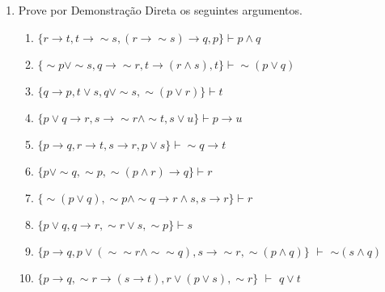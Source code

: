 \documentclass[12pt, a4paper,final]{article}
\begin{document}
    \begin{enumerate}
        \item Prove por Demonstração Direta os seguintes argumentos.
        
        \begin{enumerate}

            \item $\{r  \rightarrow t, t \rightarrow \sim s,  (r \rightarrow \sim s) \rightarrow q,  p  \} \vdash p \wedge q $  %
            
            \item $\{\sim p  \vee \sim s, q \rightarrow \sim r,  t \rightarrow  (r \wedge s), t\} \vdash \sim (p \vee q) $  %
            
            \item $\{q \rightarrow p,  t \vee s,  q \vee \sim s, \sim(p \vee r)  \} \vdash t $  %
            
            \item $\{ p \vee q \rightarrow r, s \rightarrow \sim r \wedge \sim t, s \vee u \} \vdash p \rightarrow u$  %
            
            \item $\{ p \rightarrow q, r \rightarrow t, s \rightarrow r, p \vee s \} \vdash \sim q \rightarrow t $  %
            
            \item $\{ p \vee \sim q, \sim p, \sim (p \wedge r) \rightarrow q \} \vdash r$  %
            
            \item $\{ \sim (p \vee q), \sim p \wedge \sim q \rightarrow r \wedge s, s \rightarrow r \} \vdash r$  %
            
            \item $\{ p \vee q, q \rightarrow r, \sim r \vee s, \sim p \} \vdash s$  %
            
            \item $\{ p \rightarrow q,    p \vee (\sim \sim r \wedge \sim \sim  q), s \rightarrow \sim r, \sim (p \wedge q) \}$ {\bf $\vdash $} $\sim (s \wedge q)$  %
            
            \item $\{ p \rightarrow q,    \sim r \rightarrow (s \rightarrow t),   r \vee (p \vee s),    \sim r \}$ {\bf $\vdash $} $q \vee t$  %
            

\end{enumerate}
\end{enumerate}
\end{document}
